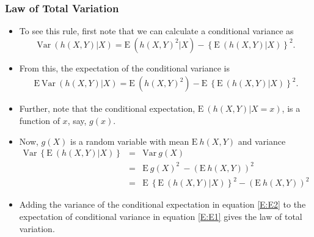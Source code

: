 \documentclass{beamer}
\begin{document}
\begin{frame}[shrink=2]
 \frametitle{Law of Total Variation}
\begin{itemize}
   \item To see this rule, first note that we can calculate a conditional variance as
$$\mathrm{Var~} \left( h(X,Y) | X \right)  =
\mathrm{E~} \left( h(X,Y)^2 | X \right) -\left\{\mathrm{E~} \left( h(X,Y) | X \right) \right\}^2.$$
\item From this, the expectation of the conditional variance is
\begin{eqnarray}\label{E:E1} \mathrm{E~} \mathrm{Var~} \left( h(X,Y) | X \right)  =
\mathrm{E~} \left( h(X,Y)^2\right) - \mathrm{E~}\left\{\mathrm{E~} \left( h(X,Y) | X \right) \right\}^2.\end{eqnarray}
\item Further, note that the conditional expectation, $\mathrm{E~} \left( h(X,Y) | X=x \right)$, is a function of $x$, say, $g(x)$.
\item Now, $g(X)$ is a random variable with mean $\mathrm{E~} h(X,Y)$ and variance
\begin{eqnarray}\label{E:E2}
\mathrm{Var~} \left\{ \mathrm{E~} \left( h(X,Y) | X \right) \right \} &=&\mathrm{Var~} g(X)  \nonumber \\
&=& \mathrm{E~} g(X)^2\ - \left(\mathrm{E~} h(X,Y)\right)^2 \nonumber\\
&=& \mathrm{E~} \left\{\mathrm{E~} \left( h(X,Y) | X \right) \right\}^2
- \left(\mathrm{E~} h(X,Y)\right)^2
\end{eqnarray}
\item Adding the variance of the conditional expectation in equation \eqref{E:E2} to the expectation of conditional variance in equation \eqref{E:E1} gives the law of total variation.
 \end{itemize}
\end{frame}
\end{document}
